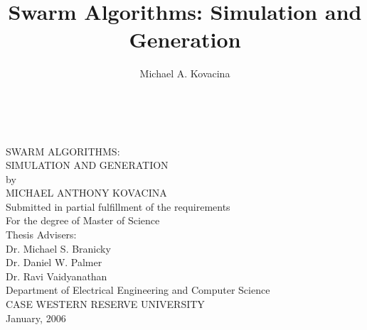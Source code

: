 %
%




\title{Swarm Algorithms: Simulation and Generation}

\author{Michael A. Kovacina}




\begin{titlepage}
\begin{centering}

~\\
\vspace{1cm}

SWARM ALGORITHMS: \\
SIMULATION AND GENERATION \\
\vspace{2cm}
by\\
MICHAEL ANTHONY KOVACINA\\
\vspace{2cm}
Submitted in partial fulfillment of the requirements\\
For the degree of Master of Science\\
\vspace{2cm}
Thesis Advisers:\\
Dr. Michael S. Branicky\\
Dr. Daniel W. Palmer\\
Dr. Ravi Vaidyanathan\\
\vspace{2cm}
Department of Electrical Engineering and Computer Science\\
CASE WESTERN RESERVE UNIVERSITY\\
\vspace{1cm}
January, 2006\\
\end{centering}
\end{titlepage}


{
	\singlespacing
	
	\tableofcontents
	\listoffigures
	\listoftables
}

\clearpage












\appendix






\singlespacing



